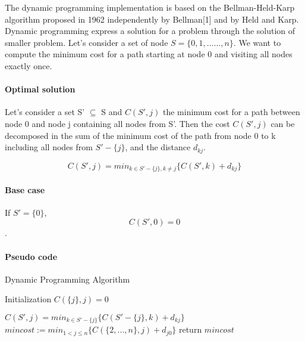 \documentclass[../report.tex]{subfiles}
\begin{document}
The dynamic programming implementation is based on the Bellman-Held-Karp algorithm  proposed in 1962 independently by Bellman[1] and by Held and Karp.
\newline{}
Dynamic programming express a solution for a problem through the solution of smaller problem.
\newline{}
Let's consider a set of node $S=\{0,1,......,n\}$. We want to compute the minimum cost for a path starting at node 0 and visiting all nodes exactly once.
\newline{}
\paragraph{Optimal solution}\hfill \break
Let's consider a set S' $\subseteq$ S and $C(S',j)$ the minimum cost for a path between node 0 and node j containing all nodes from S'. Then the cost $C(S',j)$ can be decomposed in the sum of the minimum cost of the path from node 0 to k including all nodes from $S'-\{j\}$, and the distance $d_{kj}$.

$$C(S',j)=min_{k \in S'-\{j\}, k \ne j}\{C(S',k)+d_{kj}\}$$

\paragraph{Base case}\hfill \break
If $S'=\{0\}$, $$C(S',0)=0$$.

\paragraph{Pseudo code}\hfill

\begin{center}
	\colorbox[gray]{0.95}{
	\begin{minipage}{0.65\textwidth}
			\begin{algorithm}[H]
			\caption{Dynamic Programming Algorithm}
			\begin{algorithmic} 
			\STATE Initialization
			\STATE $C(\{j\},j)=0$
			\ENDFOR

					 \STATE $C(S',j)=min_{k \in S'-\{j\}}\{C(S'-\{j\},k)+d_{kj}\}$
				  \ENDFOR
			   \ENDFOR
			\ENDFOR
			\STATE $mincost := min_{1<j \leq n}\{C(\{2,...,n\},j)+d_{j0}\}$
			\STATE return $mincost$
			\end{algorithmic}
			\end{algorithm}
	 \end{minipage}}
\end{center}
\end{document}
